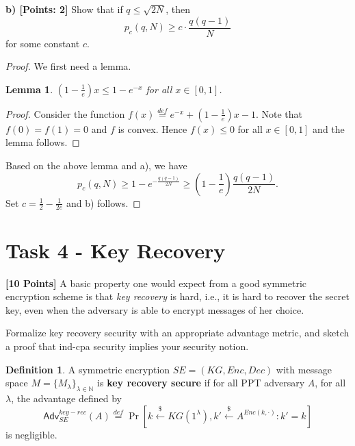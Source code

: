\documentclass[12pt]{article}
\newcommand{\eqdef}{\stackrel{def}{=}}
\newcommand{\N}{\mathbb{N}}
\newcommand{\getsr}{\stackrel{\$}{\gets}}
\newcommand{\Adv}{\textsf{Adv}}
\newtheorem{lemma}[theorem]{Lemma}
\theoremstyle{definition}
\newtheorem{definition}[theorem]{Definition}
\begin{document}
{\bf b) [Points: 2]} Show that if $q \leq \sqrt{2N}$, then 
$$p_c(q,N) \geq c \cdot \frac{q(q-1)}{N}$$
for some constant $c$.
\begin{proof}
We first need a lemma.
\begin{lemma}
$\left( 1-\frac{1}{e} \right)x \leq 1-e^{-x}$ for all $x \in [0,1]$.
\end{lemma}
\begin{proof}
Consider the function $f(x) \eqdef e^{-x} + \left( 1-\frac{1}{e} \right)x-1$. Note that $f(0) = f(1) = 0$ and $f$ is convex. Hence $f(x) \leq 0$ for all $x \in [0,1]$ and the lemma follows.
\end{proof}
Based on the above lemma and a), we have
$$p_c(q, N) \geq 1-e^{-\frac{q(q-1)}{2N}} \geq \left( 1-\frac{1}{e} \right)\frac{q(q-1)}{2N}.$$
Set $c = \frac{1}{2} - \frac{1}{2e}$ and b) follows.
\end{proof}


\section{Task 4 - Key Recovery}
{\bf [10 Points]} A basic property one would expect from a good symmetric encryption scheme is that \emph{key
recovery} is hard, i.e., it is hard to recover the secret key, even when the adversary is able to
encrypt messages of her choice.

Formalize key recovery security with an appropriate advantage metric, and sketch a proof
that ind-cpa security implies your security notion.

\begin{definition}
A symmetric encryption $SE = (KG, Enc, Dec)$ with message space $M = \{M_\lambda\}_{\lambda \in \N}$ is {\bf key recovery secure} if for all PPT adversary $A$, for all $\lambda$, the advantage defined by
$$\Adv_{SE}^{key-rec}(A) \eqdef \Pr[k \getsr KG(1^\lambda), k' \getsr A^{Enc(k,\cdot)} : k' = k]$$
is negligible. 
\end{definition}
\end{document}
